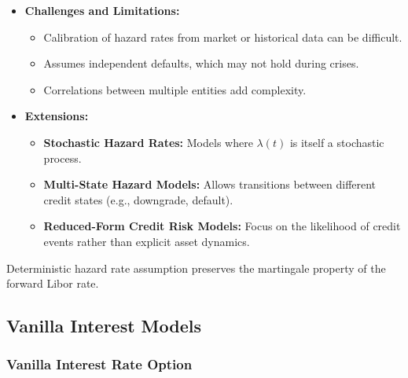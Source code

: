 \begin{itemize}
    \item \textbf{Challenges and Limitations:}
    \begin{itemize}
        \item Calibration of hazard rates from market or historical data can be difficult.
        \item Assumes independent defaults, which may not hold during crises.
        \item Correlations between multiple entities add complexity.
    \end{itemize}
    
    \item \textbf{Extensions:}
    \begin{itemize}
        \item \textbf{Stochastic Hazard Rates:} Models where \(\lambda(t)\) is itself a stochastic process.
        \item \textbf{Multi-State Hazard Models:} Allows transitions between different credit states (e.g., downgrade, default).
        \item \textbf{Reduced-Form Credit Risk Models:} Focus on the likelihood of credit events rather than explicit asset dynamics.
    \end{itemize}
\end{itemize}


\begin{theorem}
	Deterministic hazard rate assumption preserves the martingale property of the forward Libor rate.
\end{theorem}


\subsection{Vanilla Interest Models}
\subsubsection{Vanilla Interest Rate Option}

\begin{theorem}
\end{theorem}

\begin{theorem}	
\end{theorem}

\begin{theorem}
\end{theorem}



